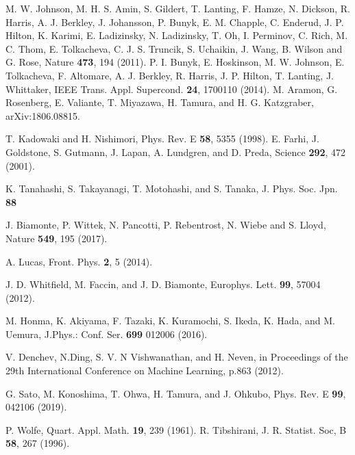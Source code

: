 \documentclass[fp,twocolumn]{jpsj3}
\begin{document}
\begin{thebibliography}{1}
  M. W. Johnson, M. H. S. Amin, S. Gildert, T. Lanting, F. Hamze, N. Dickson, R. Harris, A. J. Berkley, J. Johansson, P. Bunyk, E. M. Chapple, C. Enderud, J. P. Hilton, K. Karimi, E. Ladizinsky, N. Ladizinsky, T. Oh, I. Perminov, C. Rich, M. C. Thom, E. Tolkacheva, C. J. S. Truncik, S. Uchaikin, J. Wang, B. Wilson and G. Rose, Nature {\bf 473}, 194 (2011).
  P. I. Bunyk, E. Hoskinson, M. W. Johnson, E. Tolkacheva, F. Altomare, A. J. Berkley, R. Harris, J. P. Hilton, T. Lanting, J. Whittaker, IEEE Trans. Appl. Supercond. {\bf 24}, 1700110 (2014).
  M. Aramon, G. Rosenberg, E. Valiante, T. Miyazawa, H. Tamura, and H. G. Katzgraber, arXiv:1806.08815.

T. Kadowaki and H. Nishimori, Phys. Rev. E {\bf 58}, 5355 (1998).
E. Farhi, J. Goldstone, S. Gutmann, J. Lapan, A. Lundgren, and D. Preda, Science {\bf 292}, 472 (2001).

K. Tanahashi, S. Takayanagi, T. Motohashi, and S. Tanaka, J. Phys. Soc. Jpn. {\bf 88}

J. Biamonte, P. Wittek, N. Pancotti, P. Rebentrost, N. Wiebe and S. Lloyd, Nature {\bf 549}, 195 (2017).

A. Lucas, Front. Phys. {\bf 2}, 5 (2014).


J. D. Whitfield, M. Faccin, and J. D. Biamonte, Europhys. Lett. {\bf 99}, 57004 (2012).


  M. Honma, K. Akiyama, F. Tazaki, K. Kuramochi, S. Ikeda, K. Hada, and M. Uemura, J.Phys.: Conf. Ser. {\bf 699} 012006 (2016).

  V. Denchev, N.Ding, S. V. N Vishwanathan, and H. Neven, in Proceedings of the 29th International Conference on Machine Learning, p.863 (2012).

  G. Sato, M. Konoshima, T. Ohwa, H. Tamura, and J. Ohkubo, Phys. Rev. E {\bf 99}, 042106 (2019).

  P. Wolfe, Quart. Appl. Math. {\bf 19}, 239 (1961).
  R. Tibshirani, J. R. Statist. Soc, B {\bf 58}, 267 (1996).
  
\end{thebibliography}
\end{document}
